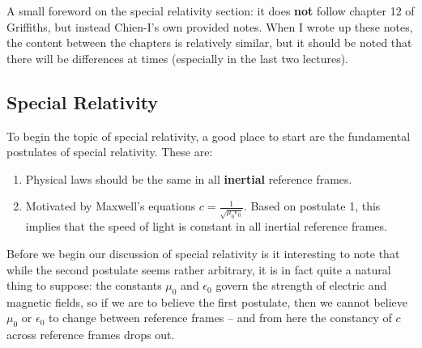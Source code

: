 A small foreword on the special relativity section: it does \textbf{not} follow chapter 12 of Griffiths, but
instead Chien-I's own provided notes. When I wrote up these notes, the content between the chapters is
relatively similar, but it should be noted that there will be differences at times (especially in the last
two lectures).    
  

\subsection{Special Relativity}
To begin the topic of special relativity, a good place to start are the fundamental postulates of special
relativity. These are:
\begin{enumerate}[label=\arabic*.]
	\item Physical laws should be the same in all \textbf{inertial} reference frames. 
	\item Motivated by Maxwell's equations \( c = \frac{1}{\sqrt{\mu_0 \epsilon_0}} \). Based on postulate 1,
		this implies that the speed of light is constant in all inertial reference frames. 
\end{enumerate}
Before we begin our discussion of special relativity is it interesting to note that while the second
postulate seems rather arbitrary, it is in fact quite a natural thing to suppose: the constants \( \mu_0 \)
and \( \epsilon_0 \) govern the strength of electric and magnetic fields, so if we are to believe the first
postulate, then we cannot believe \( \mu_0 \) or \( \epsilon_0 \) to change between reference frames -- and
from here the constancy of \( c \) across reference frames drops out. 

